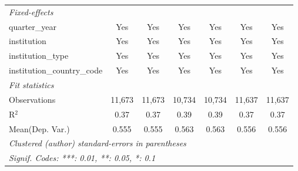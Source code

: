 \begin{tabular}{lcccccc}
   \midrule
   \emph{Fixed-effects}\\
   quarter\_year                      & Yes     & Yes           & Yes     & Yes     & Yes     & Yes\\  
   institution                        & Yes     & Yes           & Yes     & Yes     & Yes     & Yes\\  
   institution\_type                  & Yes     & Yes           & Yes     & Yes     & Yes     & Yes\\  
   institution\_country\_code         & Yes     & Yes           & Yes     & Yes     & Yes     & Yes\\  
   \midrule
   \emph{Fit statistics}\\
   Observations                       & 11,673  & 11,673        & 10,734  & 10,734  & 11,637  & 11,637\\  
   R$^2$                              & 0.37    & 0.37          & 0.39    & 0.39    & 0.37    & 0.37\\  
Mean(Dep. Var.) & 0.555 & 0.555 & 0.563 & 0.563 & 0.556 & 0.556 \\
   \midrule \midrule
   \multicolumn{7}{l}{\emph{Clustered (author) standard-errors in parentheses}}\\
   \multicolumn{7}{l}{\emph{Signif. Codes: ***: 0.01, **: 0.05, *: 0.1}}\\
\end{tabular}
\par\endgroup
